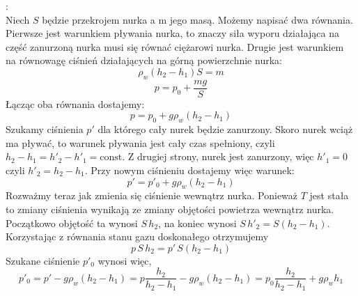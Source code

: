 \documentclass[11pt,a4paper]{article}
\begin{document}
\vspace{2mm}{\bf Rozwiązanie}:\\
Niech $S$ będzie przekrojem nurka a m jego masą. Możemy napisać dwa równania. Pierwsze jest warunkiem pływania nurka, to znaczy siła wyporu działająca na część zanurzoną nurka musi się równać ciężarowi nurka. Drugie jest warunkiem na równowagę ciśnień działających na górną powierzchnie nurka:
\[
\rho_w (h_2 - h_1) S = m
\]
\[
p=p_0+\frac{mg}{S}
\]
Łącząc oba równania dostajemy:
\[
p=p_0+g \rho_w (h_2-h_1)
\]
Szukamy ciśnienia $p'$ dla którego cały nurek będzie zanurzony. Skoro nurek wciąż ma pływać, to warunek pływania jest cały czas spełniony, czyli $h_2-h_1 = h'_2-h'_1 = \textrm{const}$.
Z drugiej strony, nurek jest zanurzony, więc $h'_1 = 0$ czyli $h'_2 = h_2-h_1$. Przy nowym ciśnieniu dostajemy więc warunek:
\[
p' = p'_0 + g \rho_w (h_2 - h_1)
\]
Rozważmy teraz jak zmienia się ciśnienie wewnątrz nurka. Ponieważ $T$ jest stała to zmiany ciśnienia wynikają ze zmiany objętości powietrza wewnątrz nurka. Początkowo objętość ta wynosi $S\,h_2$, na koniec wynosi $S\,h'_2 = S (h_2 - h_1)$. Korzystając z równania stanu gazu doskonałego otrzymujemy
\[
p\,S\,h_2 = p'\,S (h_2 - h_1)
\]
Szukane ciśnienie $p'_0$ wynosi więc,
\[
p'_0 = p'-g \rho_w (h_2 - h_1) = p \frac{h_2}{h_2-h_1}-g \rho_w (h_2 - h_1)
= p_0 \frac{h_2}{h_2-h_1}+g \rho_w h_1
\]

\clearpage
\end{document}
